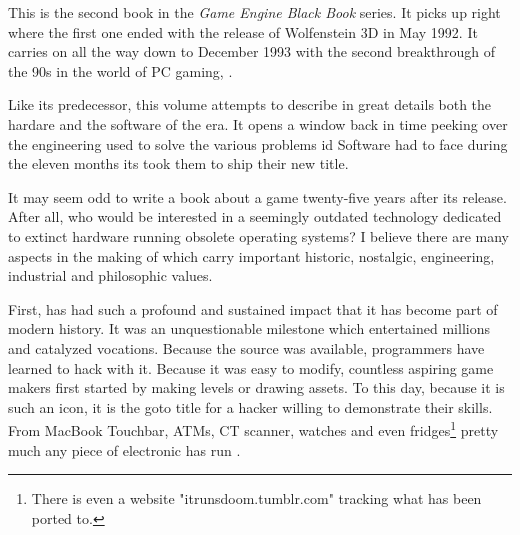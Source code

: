 This is the second book in the \textit{Game Engine Black Book} series. It picks up right where the first one ended with the release of Wolfenstein 3D in May 1992. It carries on all the way down to December 1993 with the second breakthrough of the 90s in the world of PC gaming, \doom.\\
\par
 Like its predecessor, this volume attempts to describe in great details both the hardare and the software of the era. It opens a window back in time peeking over the engineering used to solve the various problems id Software had to face during the eleven months its took them to ship their new title.\\%
\par
It may seem odd to write a book about a game twenty-five years after its release. After all, who would be interested in a seemingly outdated technology dedicated to extinct hardware running obsolete operating systems? I believe there are many aspects in the making of \doom which carry important historic, nostalgic, engineering, industrial and philosophic values.\\ 

\par
First, \doom has had such a profound and sustained impact that it has become part of modern history. It was an unquestionable milestone which entertained millions and catalyzed vocations. Because the source was available, programmers have learned to hack with it. Because it was easy to modify, countless aspiring game makers first started by making levels or drawing assets. To this day, because it is such an icon, it is the goto title for a hacker willing to demonstrate their skills. From MacBook Touchbar, ATMs, CT scanner, watches and even fridges\footnote{There is even a website "itrunsdoom.tumblr.com" tracking what \doom has been ported to.} pretty much any piece of electronic has run \doom.\\
\par

